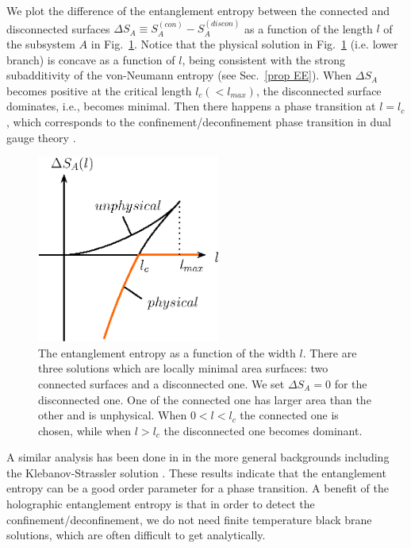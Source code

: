 \documentclass[12pt]{article}
\def\D{{\Delta}}
\def\D{{\Delta}}
\begin{document}
We plot the difference of the entanglement entropy between the connected and disconnected surfaces $\D S_A \equiv S_A^{(con)} -
S_A^{(discon)}$ as a function of the length $l$ of the subsystem $A$ in
Fig.\ \ref{fig:entropydiff}.
Notice that the physical solution in Fig.\ \ref{fig:entropydiff} (i.e. lower branch) is
concave as a function of $l$, being consistent with the strong subadditivity of the von-Neumann entropy
(see Sec.\ \ref{prop EE}).
When $\D S_A$ becomes positive at the critical length $l_c(<l_{max})$, the disconnected surface dominates, i.e.,
becomes minimal. Then there happens a phase transition at $l=l_c$, which corresponds to the confinement/deconfinement
phase transition in dual gauge theory \cite{Nishioka:2006gr,Klebanov:2007ws}.


\begin{figure}
\begin{center}
\includegraphics[width=6cm,clip]{entropydif.eps}
\end{center}
\caption{
\label{fig:entropydiff}
The entanglement entropy as a function of the width $l$. There are three solutions which are locally minimal
area surfaces: two connected surfaces and a disconnected one. We set $\Delta S_A=0$ for the disconnected one.
One of the connected one has larger area than the
other and is unphysical. When $0<l<l_{c}$ the connected one is chosen, while when $l>l_c$ the disconnected one
becomes dominant.}
\end{figure}

A similar analysis has been done in \cite{Klebanov:2007ws} in the more general backgrounds
including the Klebanov-Strassler solution \cite{KlSt}.
These results indicate that
the entanglement entropy can be a good order parameter for a phase transition.
A benefit of the holographic entanglement entropy is that in order to detect
the confinement/deconfinement, we do not need finite temperature black brane solutions,
which are often difficult to get analytically.
\end{document}
